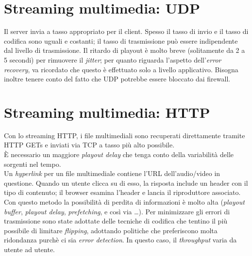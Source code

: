 \section{Streaming multimedia: UDP}
Il server invia a tasso appropriato per il client. Spesso il tasso di invio e il tasso di codifica sono uguali e costanti; il tasso di trasmissione può essere indipendente dal livello di trasmissione. Il ritardo di playout è molto breve (solitamente da 2 a 5 secondi) per rimuovere il \textit{jitter}; per quanto riguarda l'aspetto dell'\textit{error recovery}, va ricordato che questo è effettuato solo a livello applicativo. Bisogna inoltre tenere conto del fatto che UDP potrebbe essere bloccato dai firewall.

\section{Streaming multimedia: HTTP}
Con lo streaming HTTP, i file multimediali sono recuperati direttamente tramite HTTP GETs e inviati via TCP a tasso più alto possibile.\\
È necessario un maggiore \textit{playout delay} che tenga conto della variabilità delle sorgenti nel tempo.\\
Un \textit{hyperlink} per un file multimediale contiene l'URL dell'audio/video in questione. Quando un utente clicca su di esso, la risposta include un header con il tipo di contenuto; il browser esamina l'header e lancia il riproduttore associato.\\
Con questo metodo la possibilità di perdita di informazioni è molto alta (\textit{playout buffer}, \textit{playout delay}, \textit{prefetching}, e così via \ldots). Per minimizzare gli errori di trasmissione sono state adottate delle tecniche di codifica che tentino il più possibile di limitare \textit{flipping}, adottando politiche che preferiscono molta ridondanza purchè ci sia \textit{error detection}. In questo caso, il \textit{throughput} varia da utente ad utente.

